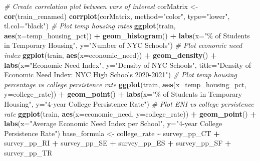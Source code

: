 \documentclass[
  man]{apa6}
\newenvironment{Shaded}{\begin{snugshade}}{\end{snugshade}}
\newcommand{\AttributeTok}[1]{\textcolor[rgb]{0.13,0.29,0.53}{#1}}
\newcommand{\CommentTok}[1]{\textcolor[rgb]{0.56,0.35,0.01}{\textit{#1}}}
\newcommand{\FunctionTok}[1]{\textcolor[rgb]{0.13,0.29,0.53}{\textbf{#1}}}
\newcommand{\NormalTok}[1]{#1}
\newcommand{\OtherTok}[1]{\textcolor[rgb]{0.56,0.35,0.01}{#1}}
\newcommand{\SpecialCharTok}[1]{\textcolor[rgb]{0.81,0.36,0.00}{\textbf{#1}}}
\newcommand{\StringTok}[1]{\textcolor[rgb]{0.31,0.60,0.02}{#1}}
\begin{document}
\begin{Shaded}
\begin{Highlighting}[]
\CommentTok{\# Create correlation plot between vars of interest}
\NormalTok{corMatrix }\OtherTok{\textless{}{-}} \FunctionTok{cor}\NormalTok{(train\_renamed)}
\FunctionTok{corrplot}\NormalTok{(corMatrix, }\AttributeTok{method=}\StringTok{"color"}\NormalTok{, }\AttributeTok{type=}\StringTok{"lower"}\NormalTok{, }\AttributeTok{tl.col=}\StringTok{"black"}\NormalTok{)}
\CommentTok{\# Plot temp housing rates}
\FunctionTok{ggplot}\NormalTok{(train, }\FunctionTok{aes}\NormalTok{(}\AttributeTok{x=}\NormalTok{temp\_housing\_pct)) }\SpecialCharTok{+}
  \FunctionTok{geom\_histogram}\NormalTok{() }\SpecialCharTok{+}
  \FunctionTok{labs}\NormalTok{(}\AttributeTok{x=}\StringTok{"\% of Students in Temporary Housing"}\NormalTok{, }\AttributeTok{y=}\StringTok{"Number of NYC Schools"}\NormalTok{)}
\CommentTok{\# Plot economic need index}
\FunctionTok{ggplot}\NormalTok{(train, }\FunctionTok{aes}\NormalTok{(}\AttributeTok{x=}\NormalTok{economic\_need)) }\SpecialCharTok{+}
  \FunctionTok{geom\_density}\NormalTok{() }\SpecialCharTok{+}
  \FunctionTok{labs}\NormalTok{(}\AttributeTok{x=}\StringTok{"Economic Need Index"}\NormalTok{, }\AttributeTok{y=}\StringTok{"Density of NYC Schools"}\NormalTok{,}
       \AttributeTok{title=}\StringTok{"Density of Economic Need Index: NYC High Schools 2020{-}2021"}\NormalTok{)}
\CommentTok{\# Plot temp housing percentage vs college persistence rate}
\FunctionTok{ggplot}\NormalTok{(train, }\FunctionTok{aes}\NormalTok{(}\AttributeTok{x=}\NormalTok{temp\_housing\_pct, }\AttributeTok{y=}\NormalTok{college\_rate)) }\SpecialCharTok{+}
  \FunctionTok{geom\_point}\NormalTok{() }\SpecialCharTok{+}
  \FunctionTok{labs}\NormalTok{(}\AttributeTok{x=}\StringTok{"\% of Students in Temporary Housing"}\NormalTok{,}
       \AttributeTok{y=}\StringTok{"4{-}year College Persistence Rate"}\NormalTok{)}
\CommentTok{\# Plot ENI vs college persistence rate}
\FunctionTok{ggplot}\NormalTok{(train, }\FunctionTok{aes}\NormalTok{(}\AttributeTok{x=}\NormalTok{economic\_need, }\AttributeTok{y=}\NormalTok{college\_rate)) }\SpecialCharTok{+}
  \FunctionTok{geom\_point}\NormalTok{() }\SpecialCharTok{+}
  \FunctionTok{labs}\NormalTok{(}\AttributeTok{x=}\StringTok{"Average Economic Need Index per School"}\NormalTok{,}
       \AttributeTok{y=}\StringTok{"4{-}year College Persistence Rate"}\NormalTok{)}
\NormalTok{base\_formula }\OtherTok{\textless{}{-}}\NormalTok{ college\_rate }\SpecialCharTok{\textasciitilde{}}\NormalTok{ survey\_pp\_CT }\SpecialCharTok{+}\NormalTok{ survey\_pp\_RI }\SpecialCharTok{+}\NormalTok{ survey\_pp\_SE }\SpecialCharTok{+}\NormalTok{ survey\_pp\_ES }\SpecialCharTok{+}\NormalTok{ survey\_pp\_SF }\SpecialCharTok{+}\NormalTok{ survey\_pp\_TR}

\end{Highlighting}
\end{Shaded}
\end{document}

